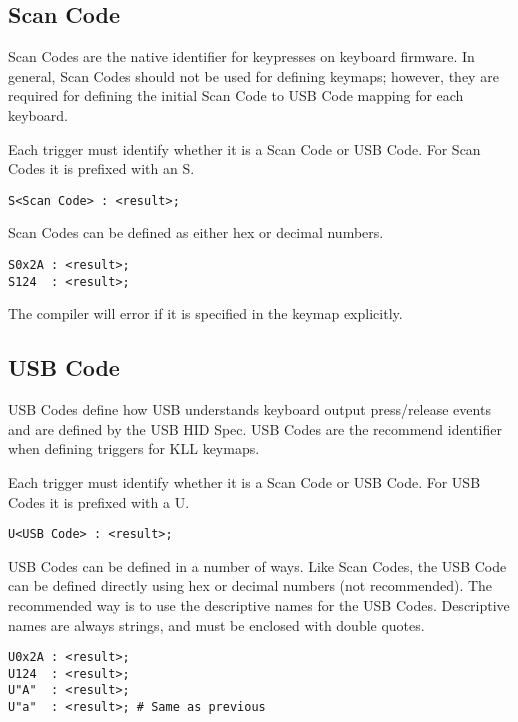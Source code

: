 \documentclass{kiibohd-template}
\begin{document}
\subsection{Scan Code}

Scan Codes are the native identifier for keypresses on keyboard firmware.
In general, Scan Codes should not be used for defining keymaps; however, they are required for defining the initial Scan Code to USB Code mapping for each keyboard.

Each trigger must identify whether it is a Scan Code or USB Code.
For Scan Codes it is prefixed with an S.

\begin{lstlisting}
S<Scan Code> : <result>;
\end{lstlisting}

Scan Codes can be defined as either hex or decimal numbers.

\begin{lstlisting}
S0x2A : <result>;
S124  : <result>;
\end{lstlisting}

The compiler will error if it is specified in the keymap explicitly.


\subsection{USB Code}
\label{subsec:USB_Code}

USB Codes define how USB understands keyboard output press/release events and are defined by the USB HID Spec.
USB Codes are the recommend identifier when defining triggers for KLL keymaps.

Each trigger must identify whether it is a Scan Code or USB Code.
For USB Codes it is prefixed with a U.

\begin{lstlisting}
U<USB Code> : <result>;
\end{lstlisting}

USB Codes can be defined in a number of ways.
Like Scan Codes, the USB Code can be defined directly using hex or decimal numbers (not recommended).
The recommended way is to use the descriptive names for the USB Codes.
Descriptive names are always strings, and must be enclosed with double quotes.

\begin{lstlisting}
U0x2A : <result>;
U124  : <result>;
U"A"  : <result>;
U"a"  : <result>; # Same as previous
\end{lstlisting}
\end{document}
